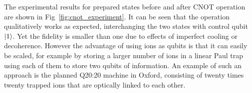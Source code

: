 The experimental results for prepared states before and after CNOT operation are
shown in Fig~\ref{fig:cnot_experiment}. It can be seen that the operation
qualitatively works as expected, interchanging the two states with control qubit
$\ket{1}$. Yet the fidelity is smaller than one due to effects of imperfect cooling or
decoherence. However the advantage of using ions as qubits is
that it can easily be scaled, for example by storing a larger number of ions in
a linear Paul trap using each of them to store two qubits of information. An
example of such an approach is the planned Q20:20 machine in Oxford, consisting
of twenty times twenty trapped ions that are optically linked to each
other\cite{walmsley2016}.
